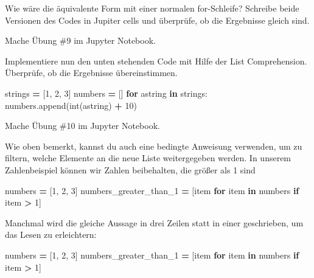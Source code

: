 \documentclass[
]{book}
\newenvironment{Shaded}{\begin{snugshade}}{\end{snugshade}}
\newcommand{\BuiltInTok}[1]{#1}
\newcommand{\ControlFlowTok}[1]{\textcolor[rgb]{0.13,0.29,0.53}{\textbf{#1}}}
\newcommand{\DecValTok}[1]{\textcolor[rgb]{0.00,0.00,0.81}{#1}}
\newcommand{\KeywordTok}[1]{\textcolor[rgb]{0.13,0.29,0.53}{\textbf{#1}}}
\newcommand{\NormalTok}[1]{#1}
\newcommand{\OperatorTok}[1]{\textcolor[rgb]{0.81,0.36,0.00}{\textbf{#1}}}
\newcommand{\StringTok}[1]{\textcolor[rgb]{0.31,0.60,0.02}{#1}}
\begin{document}
Wie wäre die äquivalente Form mit einer normalen for-Schleife? Schreibe beide Versionen des Codes in Jupiter cells und überprüfe, ob die Ergebnisse gleich sind.

Mache Übung \#9 im Jupyter Notebook.

Implementiere nun den unten stehenden Code mit Hilfe der List Comprehension. Überprüfe, ob die Ergebnisse übereinstimmen.

\begin{Shaded}
\begin{Highlighting}[]
\NormalTok{strings }\OperatorTok{=}\NormalTok{ [}\StringTok{\textquotesingle{}1\textquotesingle{}}\NormalTok{, }\StringTok{\textquotesingle{}2\textquotesingle{}}\NormalTok{, }\StringTok{\textquotesingle{}3\textquotesingle{}}\NormalTok{]}
\NormalTok{numbers }\OperatorTok{=}\NormalTok{ []}
\ControlFlowTok{for}\NormalTok{ astring }\KeywordTok{in}\NormalTok{ strings:}
\NormalTok{    numbers.append(}\BuiltInTok{int}\NormalTok{(astring) }\OperatorTok{+} \DecValTok{10}\NormalTok{)}
\end{Highlighting}
\end{Shaded}

Mache Übung \#10 im Jupyter Notebook.

Wie oben bemerkt, kannst du auch eine bedingte Anweisung verwenden, um zu filtern, welche Elemente an die neue Liste weitergegeben werden. In unserem Zahlenbeispiel können wir Zahlen beibehalten, die größer als 1 sind

\begin{Shaded}
\begin{Highlighting}[]
\NormalTok{numbers }\OperatorTok{=}\NormalTok{ [}\DecValTok{1}\NormalTok{, }\DecValTok{2}\NormalTok{, }\DecValTok{3}\NormalTok{]}
\NormalTok{numbers\_greater\_than\_1 }\OperatorTok{=}\NormalTok{ [item }\ControlFlowTok{for}\NormalTok{ item }\KeywordTok{in}\NormalTok{ numbers }\ControlFlowTok{if}\NormalTok{ item }\OperatorTok{\textgreater{}} \DecValTok{1}\NormalTok{]}
\end{Highlighting}
\end{Shaded}

Manchmal wird die gleiche Aussage in drei Zeilen statt in einer geschrieben, um das Lesen zu erleichtern:

\begin{Shaded}
\begin{Highlighting}[]
\NormalTok{numbers }\OperatorTok{=}\NormalTok{ [}\DecValTok{1}\NormalTok{, }\DecValTok{2}\NormalTok{, }\DecValTok{3}\NormalTok{]}
\NormalTok{numbers\_greater\_than\_1 }\OperatorTok{=}\NormalTok{ [item }
                          \ControlFlowTok{for}\NormalTok{ item }\KeywordTok{in}\NormalTok{ numbers}
                          \ControlFlowTok{if}\NormalTok{ item }\OperatorTok{\textgreater{}} \DecValTok{1}\NormalTok{]}
\end{Highlighting}
\end{Shaded}
\end{document}
